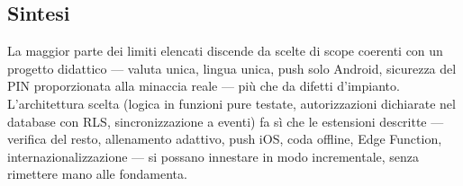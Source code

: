 \documentclass[11pt,a4paper]{article}
\begin{document}
\subsection{Sintesi}

La maggior parte dei limiti elencati discende da scelte di scope coerenti con un progetto
didattico --- valuta unica, lingua unica, push solo Android, sicurezza del PIN proporzionata alla
minaccia reale --- pi\`u che da difetti d'impianto. L'architettura scelta (logica in funzioni pure
testate, autorizzazioni dichiarate nel database con RLS, sincronizzazione a eventi) fa s\`i che le
estensioni descritte --- verifica del resto, allenamento adattivo, push iOS, coda offline, Edge
Function, internazionalizzazione --- si possano innestare in modo incrementale, senza rimettere
mano alle fondamenta.
\end{document}

